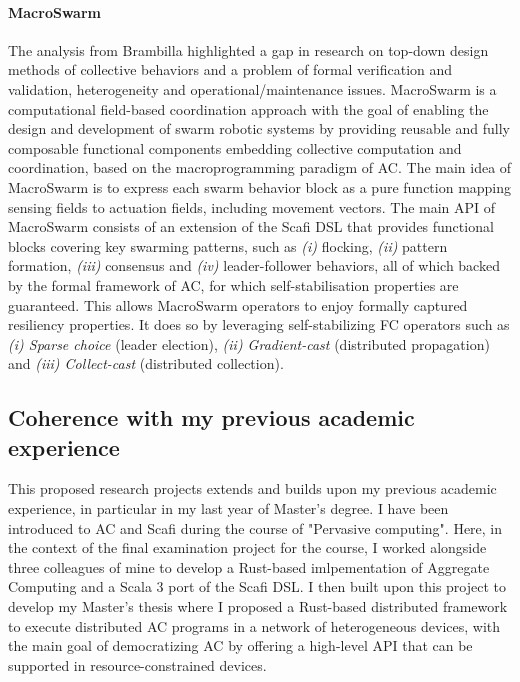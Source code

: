 \documentclass[12pt]{article}
\begin{document}
\paragraph{\textbf{MacroSwarm}} The analysis from Brambilla\cite{brambilla2013swarm} highlighted a gap in research on top-down design methods of collective behaviors and a problem of
formal verification and validation, heterogeneity and operational/maintenance issues.  
MacroSwarm\cite{aguzzi2023macroswarm} is a computational field-based coordination approach with the goal of enabling the design and development of swarm robotic systems by
providing reusable and fully composable functional components embedding collective computation and coordination, based on the macroprogramming paradigm of AC.
The main idea of MacroSwarm is to express each swarm behavior block as a pure function mapping sensing fields to actuation fields, including movement vectors.
The main API of MacroSwarm consists of an extension of the Scafi DSL that provides functional blocks covering key swarming patterns, such as \textit{(i)} flocking, \textit{(ii)} pattern formation, \textit{(iii)} consensus and \textit{(iv)} leader-follower behaviors, 
all of which backed by the formal framework of AC, for which self-stabilisation properties are guaranteed. This allows MacroSwarm operators to enjoy formally captured resiliency properties.
It does so by leveraging self-stabilizing FC operators such as \textit{(i) Sparse choice} (leader election), \textit{(ii) Gradient-cast} (distributed propagation) and \textit{(iii) Collect-cast} (distributed collection).
 

\subsection{Coherence with my previous academic experience}
This proposed research projects extends and builds upon my previous academic experience, in particular in my last year of Master's degree.
I have been introduced to AC and Scafi during the course of "Pervasive computing". Here, in the context of the final examination project for the course,
I worked alongside three colleagues of mine to develop a Rust-based imlpementation of Aggregate Computing and a Scala 3 port of the Scafi DSL.
I then built upon this project to develop my Master's thesis where I proposed a Rust-based distributed framework to execute distributed AC programs in a network of
heterogeneous devices, with the main goal of democratizing AC by offering a high-level API that can be supported in resource-constrained devices.
\end{document}
